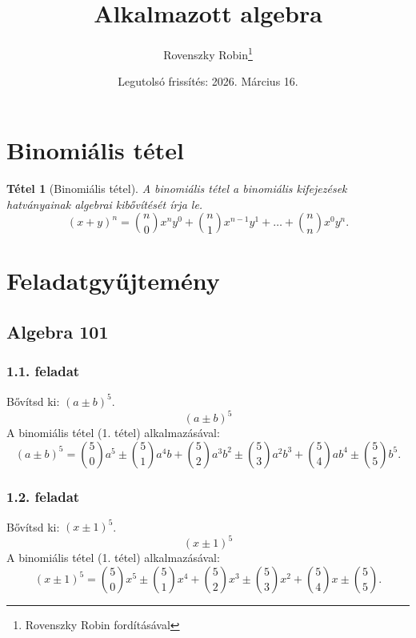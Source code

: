 \documentclass{article}
\title{Alkalmazott algebra}
\author{Rovenszky Robin\thanks{Rovenszky Robin fordításával}}
\date{Legutolsó frissítés: 2026. Március 16.}
\newtheorem{theorem}{Tétel}
\begin{document}
\maketitle
\tableofcontents
\newpage

\section{Binomiális tétel}
\begin{theorem}[Binomiális tétel]
A binomiális tétel a binomiális kifejezések hatványainak algebrai kibővítését írja le.
\begin{equation}
    (x+y)^n = \binom{n}{0}x^ny^0 + \binom{n}{1}x^{n-1}y^1 + \dots + \binom{n}{n}x^0y^n.
\end{equation}
\end{theorem}

\section{Feladatgyűjtemény}

\subsection{Algebra 101}

\subsubsection{1.1. feladat}
Bővítsd ki: $(a\pm b)^5$.
\begin{equation}
    (a \pm b)^5
\end{equation}
A binomiális tétel (1. tétel) alkalmazásával:
\begin{equation}
    (a \pm b)^5 = \binom{5}{0}a^5 \pm \binom{5}{1}a^4b + \binom{5}{2}a^3b^2 \pm \binom{5}{3}a^2b^3 + \binom{5}{4}ab^4 \pm \binom{5}{5}b^5.
\end{equation}

\subsubsection{1.2. feladat}
Bővítsd ki: $(x\pm 1)^5$.
\begin{equation}
    (x \pm 1)^5
\end{equation}
A binomiális tétel (1. tétel) alkalmazásával:
\begin{equation}
    (x \pm 1)^5 = \binom{5}{0}x^5\pm \binom{5}{1}x^4 + \binom{5}{2}x^3 \pm \binom{5}{3}x^2 + \binom{5}{4}x \pm \binom{5}{5}.
\end{equation}
\end{document}
